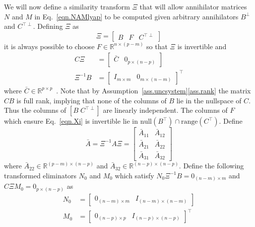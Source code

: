 \documentclass[]{../sty/JGCD}
\theoremstyle{examplestyle}
\begin{document}
  We will now define a similarity transform $\Xi$ that will allow annihilator matrices $N$ and $M$ in Eq.\ \eqref{eqn.NAMlyap} to be computed given arbitrary annihilators $B^{\perp}$ and $C^{\top\perp}$. Defining $\Xi$ as
  \begin{equation}
    \label{eqn.Xi}
    \Xi=
    \begin{bmatrix}
      B & F & C^{\top\perp}
    \end{bmatrix}
  \end{equation}
  it is always possible to choose $F\in\mathbb{R}^{n\times(p-m)}$ so that $\Xi$ is invertible and
  \begin{align*}
    C\Xi&=
    \begin{bmatrix}
      \bar{C} & 0_{p\times(n-p)}
    \end{bmatrix} \\
    \Xi^{-1}B&=
    \begin{bmatrix}
      I_{m\times m} & 0_{m\times(n-m)}
    \end{bmatrix}^{\top}
  \end{align*}
  where $\bar{C}\in\mathbb{R}^{p\times p}$\ \cite{owens.invariant.1977}.
  Note that by Assumption~\ref{ass.uncsystem}\ref{ass.rank} the matrix $CB$ is full rank, implying that none of the columns of $B$ lie in the nullspace of $C$.
  Thus the columns of $\left[ B \; C^{\top\perp} \right]$ are linearly independent.
  The columns of $F$ which ensure Eq.\ \eqref{eqn.Xi} is invertible lie in $\text{null}(B^{\top})\cap\text{range}(C^{\top})$.
  Define
  \begin{equation}
    \label{eqn.Abar}
    \bar{A}=\Xi^{-1}A\Xi=
    \left[
    \begin{array}{c|c} %
      \bar{A}_{11} & \bar{A}_{12} \\
      \hline %
      \bar{A}_{21} & \bar{A}_{22} \\
      \hline %
      \bar{A}_{31} & \bar{A}_{32}
    \end{array}\right]
  \end{equation}
  where $\bar{A}_{22}\in\mathbb{R}^{(p-m)\times(n-p)}$ and $\bar{A}_{32}\in\mathbb{R}^{(n-p)\times(n-p)}$.
  Define the following transformed eliminators $N_{0}$ and $M_{0}$ which satisfy $N_{0}\Xi^{-1}B=0_{(n-m)\times m}$ and $C\Xi M_{0}=0_{p\times(n-p)}$ as
  \begin{align}
    \label{eqn.N0}
    N_{0}&=
    \begin{bmatrix}
      0_{(n-m)\times m} & I_{(n-m)\times(n-m)}
    \end{bmatrix} \\
    \label{eqn.M0}
    M_{0}&=
    \begin{bmatrix}
      0_{(n-p)\times p} & I_{(n-p)\times(n-p)}
    \end{bmatrix}^{\top}
  \end{align}
\end{document}
